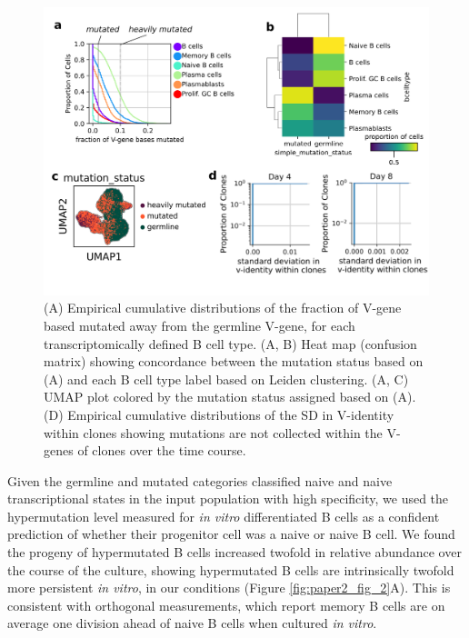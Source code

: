\begin{figure}[hbt!]
\centering
\includegraphics[width=12cm, keepaspectratio]{figs/InVitro/figS2_bcd.png}
\caption[Validation of population based lineage inference.]{(A) Empirical cumulative distributions of the fraction of V-gene based mutated away from the germline V-gene, for each transcriptomically defined B cell type. (A, B) Heat map (confusion matrix) showing concordance between the mutation status based on (A) and each B cell type label based on Leiden clustering. (A, C) UMAP plot colored by the mutation status assigned based on (A). (D) Empirical cumulative distributions of the SD in V-identity within clones showing mutations are not collected within the V-genes of clones over the time course.}
\label{fig:paper2_fig_s2}
\end{figure}

Given the germline and mutated categories classified naive and naive transcriptional states in the input population with high specificity, we used the hypermutation level measured for \textit{in vitro} differentiated B cells as a confident prediction of whether their progenitor cell was a naive or naive B cell. We found the progeny of hypermutated B cells increased twofold in relative abundance over the course of the culture, showing hypermutated B cells are intrinsically twofold more persistent \textit{in vitro}, in our conditions (Figure \ref{fig:paper2_fig_2}A). This is consistent with orthogonal measurements, which report memory B cells are on average one division ahead of naive B cells when cultured \textit{in vitro}\cite{tangye_intrinsic_2003}.


